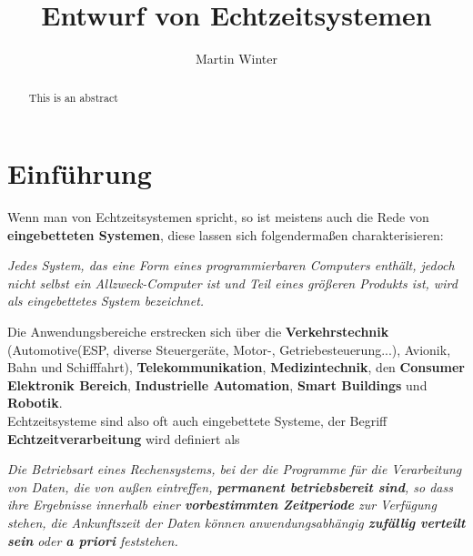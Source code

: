 \documentclass[a4paper, 10 pt, conference]{ieeeconf}
\title{\LARGE \bf Entwurf von Echtzeitsystemen}
\author{Martin Winter}
\begin{document}
\maketitle
\thispagestyle{empty}
\pagestyle{empty}


\begin{abstract}

This is an abstract 

\end{abstract}



\section{Einführung}
Wenn man von Echtzeitsystemen spricht, so ist meistens auch die Rede von \textbf{eingebetteten Systemen}, diese lassen sich folgendermaßen charakterisieren:

\begin{center}
\textit{Jedes System, das eine Form eines programmierbaren Computers enthält, jedoch nicht selbst ein Allzweck-Computer ist und Teil eines größeren Produkts ist, wird als eingebettetes System bezeichnet.}
\end{center}
Die Anwendungsbereiche erstrecken sich über die \textbf{Verkehrstechnik} (Automotive(ESP, diverse Steuergeräte, Motor-, Getriebesteuerung...), Avionik, Bahn und Schifffahrt), \textbf{Telekommunikation}, \textbf{Medizintechnik}, den \textbf{Consumer Elektronik Bereich}, \textbf{Industrielle Automation}, \textbf{Smart Buildings} und \textbf{Robotik}.\\
Echtzeitsysteme sind also oft auch eingebettete Systeme, der Begriff \textbf{Echtzeitverarbeitung} wird definiert als

\begin{center}
\textit{Die Betriebsart eines Rechensystems, bei der die Programme für die Verarbeitung von Daten, die von außen eintreffen, \textbf{permanent betriebsbereit sind}, so dass ihre Ergebnisse innerhalb einer \textbf{vorbestimmten Zeitperiode} zur Verfügung stehen, die Ankunftszeit der Daten können anwendungsabhängig \textbf{zufällig verteilt sein} oder \textbf{a priori} feststehen.}
\end{center} 
\end{document}
